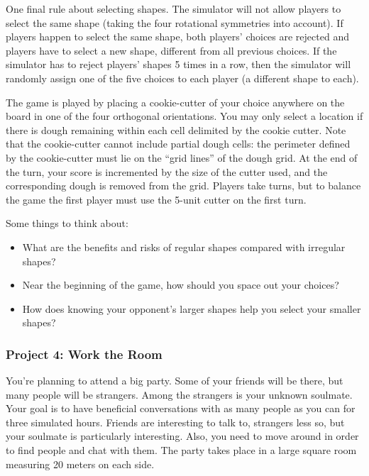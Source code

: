 One final rule about selecting shapes.  The simulator will not allow players to select
the same shape (taking the four rotational symmetries into account).  If players
happen to select the same shape, both players' choices are rejected and players have to
select a new shape, different from all previous choices.  If the simulator has to reject
players' shapes 5 times in a row, then the simulator will randomly assign one of the five
choices to each player (a different shape to each).

The game is played by placing a cookie-cutter of your choice anywhere
on the board in one of the four orthogonal orientations.  You may only
select a location if there is dough remaining within each cell
delimited by the cookie cutter.  Note that the cookie-cutter cannot include partial dough
cells: the perimeter defined by the cookie-cutter must lie on the ``grid lines'' of the dough grid.
At the end of the turn, your score is
incremented by the size of the cutter used, and the corresponding
dough is removed from the grid.  Players take turns, but to balance the
game the first player must use the 5-unit cutter on the first turn.

Some things to think about:
\begin{itemize}
\item What are the benefits and risks of regular shapes compared with irregular shapes?
\item Near the beginning of the game, how should you space out your choices?
\item How does knowing your opponent's larger shapes help you select your smaller shapes?
\end{itemize}
\subsubsection{Project 4: Work the Room}

You're planning to attend a big party.  Some of your friends will be
there, but many people will be strangers.  Among the strangers is your
unknown soulmate.  Your goal is to have beneficial conversations with
as many people as you can for three simulated hours. Friends are
interesting to talk to, strangers less so, but your soulmate is
particularly interesting.  Also, you need to move around in order to
find people and chat with them.  The party takes place in a large
square room measuring 20 meters on each side.

